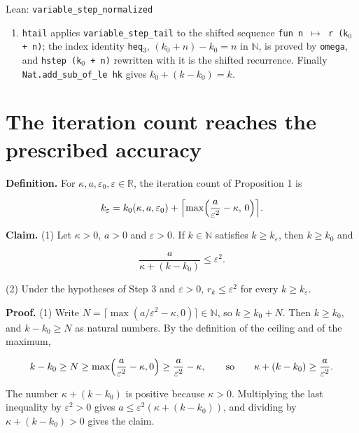 \documentclass[11pt,a4paper]{article}
\begin{document}
\begin{leanbox}{Lean: \texttt{variable\_\allowbreak{}step\_\allowbreak{}normalized}}
\begin{enumerate}
\item \texttt{htail} applies \texttt{variable\_\allowbreak{}step\_\allowbreak{}tail} to the shifted sequence \texttt{fun n \ensuremath{\mapsto} r (k\ensuremath{{}_{0}} + n)}; the index identity \texttt{heq\ensuremath{{}_{3}}}, \((k_0+n)-k_0=n\) in \(\mathbb N\), is proved by \texttt{omega}, and \texttt{hstep (k\ensuremath{{}_{0}} + n)} rewritten with it is the shifted recurrence. Finally \texttt{Nat.\allowbreak{}add\_\allowbreak{}sub\_\allowbreak{}of\_\allowbreak{}le hk} gives \(k_0+(k-k_0)=k\).

\end{enumerate}
\end{leanbox}

\section{\texorpdfstring{The iteration count reaches the prescribed accuracy}{The iteration count reaches the prescribed accuracy}}


\textbf{Definition.} For \(\kappa,a,\varepsilon_0,\varepsilon\in\mathbb R\), the iteration count of Proposition 1 is


\[k_\varepsilon=k_0(\kappa,a,\varepsilon_0)+\Bigl\lceil\max\Bigl(\frac a{\varepsilon^2}-\kappa,\,0\Bigr)\Bigr\rceil.\]


\textbf{Claim.} (1) Let \(\kappa>0\), \(a>0\) and \(\varepsilon>0\). If \(k\in\mathbb N\) satisfies \(k\ge k_\varepsilon\), then \(k\ge k_0\) and


\[\frac a{\kappa+(k-k_0)}\le\varepsilon^2.\]


(2) Under the hypotheses of Step 3 and \(\varepsilon>0\), \(r_k\le\varepsilon^2\) for every \(k\ge k_\varepsilon\).




\textbf{Proof.} (1) Write \(N=\lceil\max(a/\varepsilon^2-\kappa,0)\rceil\in\mathbb N\), so \(k\ge k_0+N\). Then \(k\ge k_0\), and \(k-k_0\ge N\) as natural numbers. By the definition of the ceiling and of the maximum,


\[k-k_0\ge N\ge\max\Bigl(\frac a{\varepsilon^2}-\kappa,0\Bigr)\ge\frac a{\varepsilon^2}-\kappa,\qquad\text{so}\qquad\kappa+(k-k_0)\ge\frac a{\varepsilon^2}.\]


The number \(\kappa+(k-k_0)\) is positive because \(\kappa>0\). Multiplying the last inequality by \(\varepsilon^2>0\) gives \(a\le\varepsilon^2(\kappa+(k-k_0))\), and dividing by \(\kappa+(k-k_0)>0\) gives the claim.
\end{document}

